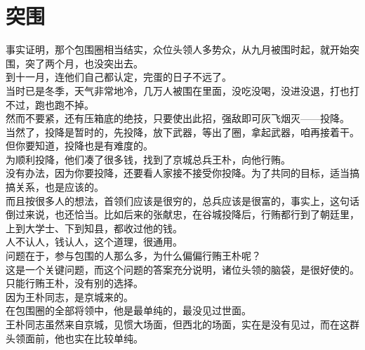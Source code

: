 \section{突围}
\ifnum{}
	\begin{multicols}{\theparacolNo}
\fi
事实证明，那个包围圈相当结实，众位头领人多势众，从九月被围时起，就开始突围，突了两个月，也没突出去。\\

到十一月，连他们自己都认定，完蛋的日子不远了。\\

当时已是冬季，天气非常地冷，几万人被围在里面，没吃没喝，没进没退，打也打不过，跑也跑不掉。\\

然而不要紧，还有压箱底的绝技，只要使出此招，强敌即可灰飞烟灭——投降。\\

当然了，投降是暂时的，先投降，放下武器，等出了圈，拿起武器，咱再接着干。\\

但你要知道，投降也是有难度的。\\

为顺利投降，他们凑了很多钱，找到了京城总兵王朴，向他行贿。\\

没有办法，因为你要投降，还要看人家接不接受你投降。为了共同的目标，适当搞搞关系，也是应该的。\\

而且按很多人的想法，首领们应该是很穷的，总兵应该是很富的，事实上，这句话倒过来说，也还恰当。比如后来的张献忠，在谷城投降后，行贿都行到了朝廷里，上到大学士、下到知县，都收过他的钱。\\

人不认人，钱认人，这个道理，很通用。\\

问题在于，参与包围的人那么多，为什么偏偏行贿王朴呢？\\

这是一个关键问题，而这个问题的答案充分说明，诸位头领的脑袋，是很好使的。\\

只能行贿王朴，没有别的选择。\\

因为王朴同志，是京城来的。\\

在包围圈的全部将领中，他是最单纯的，最没见过世面。\\

王朴同志虽然来自京城，见惯大场面，但西北的场面，实在是没有见过，而在这群头领面前，他也实在比较单纯。\\


\end{multicols}
